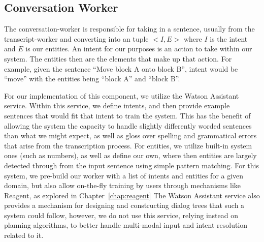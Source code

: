 \subsection{Conversation Worker}

The conversation-worker is responsible for taking in a sentence, usually from the
transcript-worker and converting into an tuple $<I, E>$ where $I$ is the intent and
$E$ is our entities. An intent for our purposes is an action to take within our system.
The entities then are the elements that make up that action. For example, given the
sentence ``Move block A onto block B'', intent would be ``move'' with the entities being
``block A'' and ``block B''.

For our implementation of this component, we utilize the Watson Assistant service. Within this
service, we define intents, and then provide example sentences that would fit that intent
to train the system. This has the benefit of allowing the system the capacity to handle slightly
differently worded sentences than what we might expect, as well as gloss over spelling and
grammatical errors that arise from the transcription process. For entities, we utilize built-in
system ones (such as numbers), as well as define our own, where then entities are largely detected
through from the input sentence using simple pattern matching. For this system, we
pre-build our worker with a list of intents and entities for a given domain, but also
allow on-the-fly training by users through mechanisms like Reagent, as explored in
Chapter~\ref{chap:reagent} The Watson Assistant service also provides a mechanism
for designing and constructing dialog trees that such a system could follow, however, we
do not use this service, relying instead on planning algorithms, to better handle multi-modal
input and intent resolution related to it.
